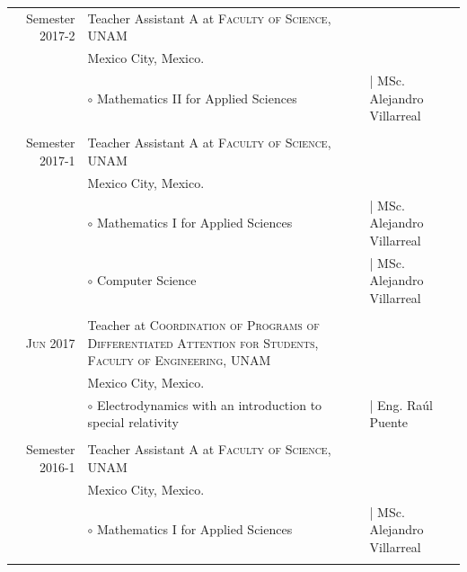 \documentclass[a4paper,10pt]{article} %
\begin{document}
\begin{tabular}{r|p{7.8cm}p{4cm}}
Semester 2017-2 & Teacher Assistant A at \textsc{Faculty of Science, UNAM} &\\
&\small Mexico City, Mexico. & \\
& \footnotesize $\circ$ Mathematics II for Applied Sciences & | {\footnotesize MSc. Alejandro Villarreal}\\
\multicolumn{3}{c}{} \\


Semester 2017-1 & Teacher Assistant A at \textsc{Faculty of Science, UNAM} &\\
&\small Mexico City, Mexico. & \\
& \footnotesize $\circ$ Mathematics I for Applied Sciences & | {\footnotesize MSc. Alejandro Villarreal}\\
& \footnotesize $\circ$ Computer Science & | {\footnotesize MSc. Alejandro Villarreal}\\
\multicolumn{3}{c}{} \\


\textsc{Jun 2017} & Teacher at \textsc{Coordination of Programs of Differentiated Attention for Students, Faculty of Engineering, UNAM} &\\
& \small Mexico City, Mexico. & \\
& \footnotesize $\circ$ Electrodynamics with an introduction to special relativity & | {\footnotesize Eng. Raúl Puente}\\
\multicolumn{3}{c}{} \\


Semester 2016-1 & Teacher Assistant A at \textsc{Faculty of Science, UNAM} &\\
& \small Mexico City, Mexico. & \\
& \footnotesize $\circ$ Mathematics I for Applied Sciences & | {\footnotesize MSc. Alejandro Villarreal}\\
\multicolumn{3}{c}{} \\
\end{tabular}

\end{document}
